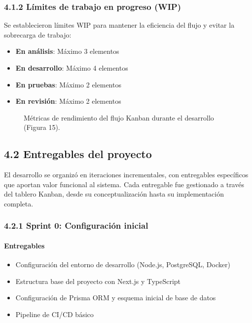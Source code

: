 \subsubsection{4.1.2 Límites de trabajo en progreso (WIP)}

Se establecieron límites WIP para mantener la eficiencia del flujo y evitar la sobrecarga de trabajo:

\begin{itemize}
\item \textbf{En análisis}: Máximo 3 elementos
\item \textbf{En desarrollo}: Máximo 4 elementos  
\item \textbf{En pruebas}: Máximo 2 elementos
\item \textbf{En revisión}: Máximo 2 elementos
\end{itemize}

\begin{figure}[H]
	\centering
	\caption{Métricas de rendimiento del flujo Kanban durante el desarrollo (Figura 15).}
	\label{fig:kanban-metrics}
\end{figure}

\subsection{4.2 Entregables del proyecto}

El desarrollo se organizó en iteraciones incrementales, con entregables específicos que aportan valor funcional al sistema. Cada entregable fue gestionado a través del tablero Kanban, desde su conceptualización hasta su implementación completa.

\subsubsection{4.2.1 Sprint 0: Configuración inicial}

\paragraph{Entregables}
\begin{itemize}
\item Configuración del entorno de desarrollo (Node.js, PostgreSQL, Docker)
\item Estructura base del proyecto con Next.js y TypeScript
\item Configuración de Prisma ORM y esquema inicial de base de datos
\item Pipeline de CI/CD básico
\end{itemize}

